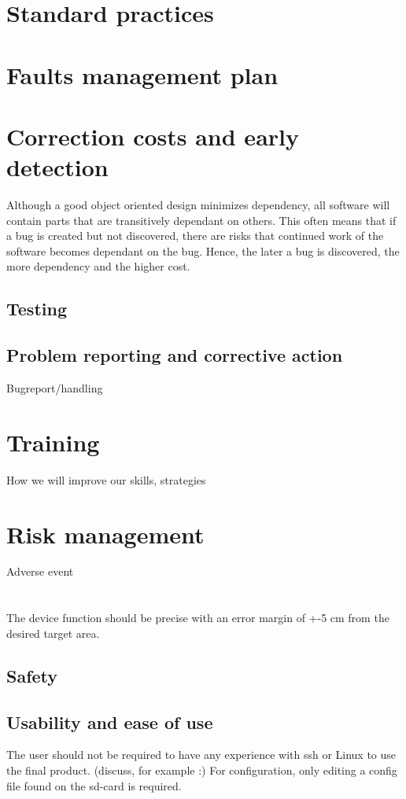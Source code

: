 \documentclass{article}
\begin{document}
\section{Standard practices}
\section{Faults management plan}
\section{Correction costs and early detection}
Although a good object oriented design minimizes dependency, all software will contain parts that are transitively dependant on others. This often means that if a bug is created but not discovered, there are risks that continued work of the software becomes dependant on the bug. Hence, the later a bug is discovered, the more dependency and the higher cost.

\subsection{Testing}
\subsection{Problem reporting and corrective action}
Bugreport/handling
\section{Training}
How we will improve our skills, strategies
\section{Risk management}
Adverse event
\section{}

The device function should be precise with an error margin of +-5 cm from the desired target area. 

\subsection{Safety}

\subsection{Usability and ease of use}
The user should not be required to have any experience with ssh or Linux to use the final product. (discuss, for example :) For configuration, only editing a config file found on the sd-card is required.
\end{document}
